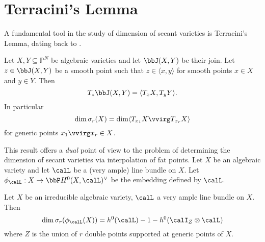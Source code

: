 

\section{Terracini's Lemma}
\label{geometrySecants-section-Terracini}

A fundamental tool in the study of dimension of secant varieties is Terracini's Lemma, dating back to \cite{Ter11}.
\begin{lemma}
\label{geometrySecants-lemma-terracini}
Let $X, Y \subseteq \mathbb{P}^N$ be algebraic varieties and let $\bbJ(X,Y)$ be their join. Let $z \in \bbJ(X,Y)$ be a smooth point such that $z \in \langle x , y \rangle$ for smooth points $x \in X$ and $y \in Y$. Then
\[
T_{z} \bbJ(X,Y) = \langle T_x X , T_y Y\rangle.
\]
In particular 
\[
\dim \sigma_r(X) = \dim \langle T_{x_1} X \vvirg T_{x_r} X\rangle
\]
for generic points $x_1 \vvirg x_r \in X$.
\end{lemma}
This result offers a \emph{dual} point of view to the problem of determining the dimension of secant varieties via interpolation of fat points. Let $X$ be an algebraic variety and let $\calL$ be a (very ample) line bundle on $X$. Let $\phi_\calL : X \to \bbP H^0(X, \calL)^\vee$ be the embedding defined by $\calL$. 

\begin{proposition}
 \label{geometrySecants-proposition-interpolationfatpoints}
 Let $X$ be an irreducible algebraic variety, $\calL$ a very ample line bundle on $X$. Then
 \[
 \dim \sigma_r( \phi_\calL(X)) = h^0(\calL)-1 - h^0( \calI_{Z} \otimes \calL)
 \]
 where $Z$ is the union of $r$ double points supported at generic points of $X$.
\end{proposition}
